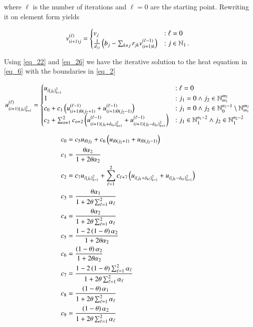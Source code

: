 \documentclass[11pt,english,a4paper]{article}
\begin{document}
\begin{flushleft}
where $\ell$ is the number of iterations and $\ell=0$ are the starting point. Rewriting it on element form yields

\begin{align*}
v_{(i+1)j}^{(\ell)} = \begin{cases} v_j &: \ell = 0 \\ \frac{1}{d_{jj}}\left({b_j - \sum_{k\neq j} r_{jk} v_{(i+1)k}^{(\ell-1)}}\right) &: j\in\mathbb{N}_1 \,.\end{cases}
\end{align*}

Using \eqref{eq_22} and \eqref{eq_26} we have the iterative solution to the heat equation in \eqref{eq_6} with the boundaries in \eqref{eq_2}

\begin{align}
u_{(i+1)\left\lbrace{j_k}\right\rbrace_{k=1}^2}^{(\ell)} = \begin{cases}
u_{i\left\lbrace{j_k}\right\rbrace_{k=1}^2} &: \ell = 0 \\
1 &: j_1=0 \wedge j_2\in\mathbb{N}_{m_1}^{m_2} \\
c_0 + c_1\left({u_{(i+1)0(j_2+1)}^{(\ell-1)}+u_{(i+1)0(j_2-1)}^{(\ell-1)}}\right) &: j_1=0 \wedge j_2\in\mathbb{N}_0^{n_2-1} \setminus\mathbb{N}_{m_1}^{m_2} \\
c_2 + \sum_{o=1}^2 c_{o+2}\left({u_{(i+1)\left\lbrace{j_k+\delta_{ko}}\right\rbrace_{k=1}^2}^{(\ell-1)}+u_{(i+1)\left\lbrace{j_k-\delta_{ko}}\right\rbrace_{k=1}^2}^{(\ell-1)}}\right) &: j_1\in \mathbb{N}_{1}^{n_1-2} \wedge j_2\in\mathbb{N}_1^{n_2-2} 
\end{cases} 
\label{eq_27}
\end{align}

\begin{align}
c_0 &= c_5 u_{i0j_2} + c_6\left({u_{i0(j_2+1)} + u_{i0(j_2-1)}}\right)
\label{eq_28}\\
c_1 &= \frac{\theta \alpha_2}{1+2\theta\alpha_2}
\label{eq_29}\\
c_2 &= c_7 u_{i\left\lbrace{j_k}\right\rbrace_{k=1}^2} + \sum_{\ell=1}^2 c_{\ell+7} \left({u_{i\left\lbrace{j_k+\delta_{k\ell}}\right\rbrace_{k=1}^2} + u_{i\left\lbrace{j_k-\delta_{k\ell}}\right\rbrace_{k=1}^2}}\right)
\label{eq_30}\\
c_3 &= \frac{\theta \alpha_1}{1+ 2\theta \sum_{\ell = 1}^2 \alpha_\ell}
\label{eq_31}\\
c_4 &= \frac{\theta \alpha_2}{1+ 2\theta \sum_{\ell = 1}^2 \alpha_\ell}
\label{eq_32}\\
c_5 &= \frac{1-2\left({1-\theta}\right)\alpha_2}{1+2\theta \alpha_2} 
\label{eq_33}\\
c_6 &= \frac{\left({1-\theta}\right)\alpha_2}{1+2\theta \alpha_2} 
\label{eq_34}\\
c_7 &= \frac{1-2\left({1-\theta}\right)\sum_{\ell = 1}^2 \alpha_\ell}{1+ 2\theta \sum_{\ell = 1}^2 \alpha_\ell}
\label{eq_35}\\
c_8 &= \frac{\left({1-\theta}\right)\alpha_1}{1+ 2\theta \sum_{\ell = 1}^2 \alpha_\ell}
\label{eq_36}\\
c_9 &= \frac{\left({1-\theta}\right)\alpha_2}{1+ 2\theta \sum_{\ell = 1}^2 \alpha_\ell}
\label{eq_37}
\end{align}


\end{flushleft}
\end{document}
